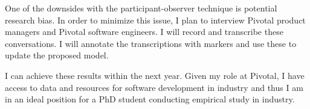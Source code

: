 \documentclass[preprint,12pt,3p]{elsarticle}
\begin{document}

One of the downsides with the participant-observer technique is potential research bias. In order to minimize this issue, I plan to interview Pivotal product managers and Pivotal software engineers. I will record and transcribe these conversations. I will annotate the transcriptions with markers and use these to update the proposed model.

I can achieve these results within the next year. Given my role at Pivotal, I have access to data and resources for software development in industry and thus I am in an ideal position for a PhD student conducting empirical study in industry.



\end{document}
